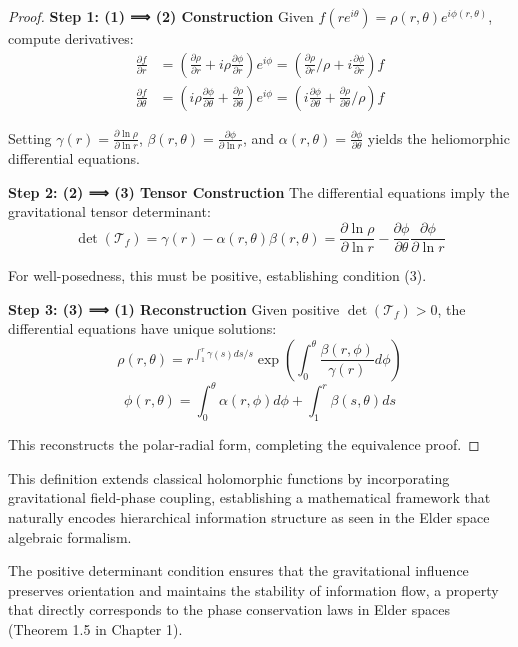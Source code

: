 \begin{proof}
\textbf{Step 1: (1) ⟹ (2) Construction}
Given $f(re^{i\theta}) = \rho(r,\theta)e^{i\phi(r,\theta)}$, compute derivatives:
\begin{align}
\frac{\partial f}{\partial r} &= \left(\frac{\partial \rho}{\partial r} + i\rho\frac{\partial \phi}{\partial r}\right)e^{i\phi} = \left(\frac{\partial \rho}{\partial r}/\rho + i\frac{\partial \phi}{\partial r}\right)f\\
\frac{\partial f}{\partial \theta} &= \left(i\rho\frac{\partial \phi}{\partial \theta} + \frac{\partial \rho}{\partial \theta}\right)e^{i\phi} = \left(i\frac{\partial \phi}{\partial \theta} + \frac{\partial \rho}{\partial \theta}/\rho\right)f
\end{align}

Setting $\gamma(r) = \frac{\partial \ln \rho}{\partial \ln r}$, $\beta(r,\theta) = \frac{\partial \phi}{\partial \ln r}$, and $\alpha(r,\theta) = \frac{\partial \phi}{\partial \theta}$ yields the heliomorphic differential equations.

\textbf{Step 2: (2) ⟹ (3) Tensor Construction}
The differential equations imply the gravitational tensor determinant:
$$\det(\mathcal{T}_f) = \gamma(r) - \alpha(r,\theta)\beta(r,\theta) = \frac{\partial \ln \rho}{\partial \ln r} - \frac{\partial \phi}{\partial \theta}\frac{\partial \phi}{\partial \ln r}$$

For well-posedness, this must be positive, establishing condition (3).

\textbf{Step 3: (3) ⟹ (1) Reconstruction}
Given positive $\det(\mathcal{T}_f) > 0$, the differential equations have unique solutions:
$$\rho(r,\theta) = r^{\int_1^r \gamma(s)ds/s} \exp\left(\int_0^\theta \frac{\beta(r,\phi)}{\gamma(r)} d\phi\right)$$
$$\phi(r,\theta) = \int_0^\theta \alpha(r,\phi) d\phi + \int_1^r \beta(s,\theta) ds$$

This reconstructs the polar-radial form, completing the equivalence proof.
\end{proof}

This definition extends classical holomorphic functions by incorporating gravitational field-phase coupling, establishing a mathematical framework that naturally encodes hierarchical information structure as seen in the Elder space algebraic formalism.



\begin{remark}
The positive determinant condition ensures that the gravitational influence preserves orientation and maintains the stability of information flow, a property that directly corresponds to the phase conservation laws in Elder spaces (Theorem 1.5 in Chapter 1).
\end{remark}

